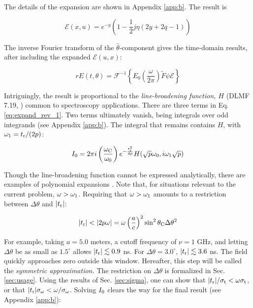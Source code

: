 \documentclass[amsmath,amssymb,aps,prd,10pt,twocolumn]{revtex4}
\begin{document}
The details of the expansion are shown in Appendix \ref{app:b}.  The result is

\begin{equation}
\mathcal{E}(x,u) = e^{-y} \left( 1 - \frac{1}{2} j\eta\left( 2y + 2q - 1 \right) \right) \label{eq:expand_rev_1}
\end{equation}

The inverse Fourier transform of the $\hat{\theta}$-component gives the time-domain results, after including the expanded $\mathcal{E}(u,x)$:

\begin{equation}
r E(t,\theta) = \mathcal{F}^{-1} \left\lbrace E_0 \left(\frac{\omega}{2\pi}\right) \widetilde{F} \psi \mathcal{E} \right\rbrace
\end{equation}

Intriguingly, the result is proportional to the \textit{line-broadening function, $H$} (DLMF 7.19, \cite{NIST:DLMF}) common to spectroscopy applications.  There are three terms in Eq. \ref{eq:expand_rev_1}.  Two terms ultimately vanish, being integrals over odd integrands (see Appendix \ref{app:b}).  The integral that remains contains $H$, with $\omega_{\rm 1} = t_{\rm r}/(2p)$:

\begin{equation}
I_{\rm 0} = 2 \pi i \left( \frac{\omega_{\rm C}}{\omega_{\rm 0}} \right) e^{- \frac{t_{\rm r}^2}{4p}} H(\sqrt{p}\omega_0,i\omega_1\sqrt{p})
\end{equation}

Though the line-broadening function cannot be expressed analytically, there are examples of polynomial expansions \cite{10.1111/j.1365-2966.2006.10450.x}.  Note that, for situations relevant to the current problem, $\omega > \omega_{\rm 1}$.  Requiring that $\omega > \omega_{\rm 1}$ amounts to a restriction between $\Delta\theta$ and $|t_{\rm r}|$:

\begin{equation}
|t_{\rm r}| < | 2 p \omega | = \omega \left(\frac{a}{c}\right)^2 \sin^2\theta_{\rm C}\Delta\theta^2 \label{eq:restrict}
\end{equation}

For example, taking $a = 5.0$ meters, a cutoff frequency of $\nu = 1$ GHz, and letting $\Delta \theta$ be as small as $1.5^{\circ}$ allows $|t_{\rm r}| \lesssim 0.9$ ns.  For $\Delta \theta = 3.0^{\circ}$, $|t_{\rm r}| \lesssim 3.6$ ns.  The field quickly approaches zero outside this window.  Hereafter, this step will be called the \textit{symmetric approximation.}  The restriction on $\Delta\theta$ is formalized in Sec. \ref{sec:usage}.  Using the results of Sec. \ref{sec:sigma}, one can show that $|t_{\rm r}|/\sigma_{\rm t} < \omega \sigma_{\rm t}$, or that $|t_{\rm r}|\sigma_{\rm \omega} < \omega/\sigma_{\rm \omega}$.  Solving $I_{\rm 0}$ clears the way for the final result (see Appendix \ref{app:b}):
\end{document}
